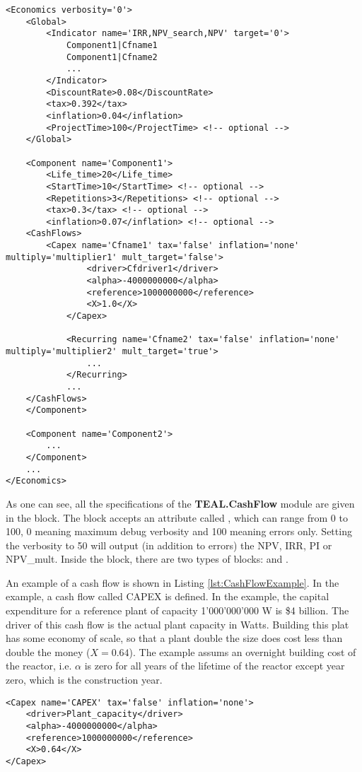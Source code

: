\begin{lstlisting}[style=XML,morekeywords={anAttribute},caption=Economics input example., label=lst:InputExample]
<Economics verbosity='0'>
    <Global>
        <Indicator name='IRR,NPV_search,NPV' target='0'>
            Component1|Cfname1
            Component1|Cfname2
            ...
        </Indicator>
        <DiscountRate>0.08</DiscountRate>
        <tax>0.392</tax>
        <inflation>0.04</inflation>
        <ProjectTime>100</ProjectTime> <!-- optional -->
    </Global>

    <Component name='Component1'>
        <Life_time>20</Life_time>
        <StartTime>10</StartTime> <!-- optional -->
        <Repetitions>3</Repetitions> <!-- optional -->
        <tax>0.3</tax> <!-- optional -->
        <inflation>0.07</inflation> <!-- optional -->
	<CashFlows>
	    <Capex name='Cfname1' tax='false' inflation='none' multiply='multiplier1' mult_target='false'>
    	        <driver>Cfdriver1</driver>
                <alpha>-4000000000</alpha>
                <reference>1000000000</reference>
                <X>1.0</X>
            </Capex>

            <Recurring name='Cfname2' tax='false' inflation='none' multiply='multiplier2' mult_target='true'>
                ...
            </Recurring>
            ...
	</CashFlows>
    </Component>

    <Component name='Component2'>
        ...
    </Component>
    ...
</Economics>
\end{lstlisting}

As one can see, all the specifications of the \textbf{TEAL.CashFlow} module are given in the  block. The block accepts an attribute called ,
which can range from 0 to 100, 0 meaning maximum debug verbosity and 100 meaning
errors only. Setting the verbosity to 50 will output (in addition to errors) the
 NPV, IRR, PI or NPV\_mult. Inside the  block, there are two
 types of blocks:  and .

An example of a cash flow is shown in Listing \ref{lst:CashFlowExample}. In the example, a cash flow called CAPEX is defined.
In the example, the capital expenditure for a reference plant of capacity
1'000'000'000 W is \$4 billion. The driver of this cash flow is the actual plant capacity in Watts. Building this plat has some economy
of scale, so that a plant double the size does cost
less than double the money ($X=0.64$). The example assums an overnight building cost of the reactor, i.e. $\alpha$ is zero for
all years of the lifetime of the reactor except year zero, which is the construction year.

\begin{lstlisting}[style=XML,morekeywords={anAttribute},caption=CashFlow input example., label=lst:CashFlowExample]
<Capex name='CAPEX' tax='false' inflation='none'>
    <driver>Plant_capacity</driver>
    <alpha>-4000000000</alpha>
    <reference>1000000000</reference>
    <X>0.64</X>
</Capex>
\end{lstlisting}